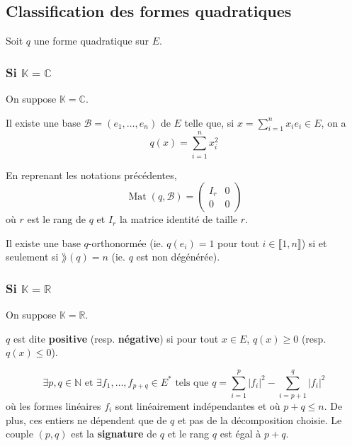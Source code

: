 	\subsection{Classification des formes quadratiques}
	
	Soit $q$ une forme quadratique sur $E$.
	
	\subsubsection{Si \texorpdfstring{$\mathbb{K} = \mathbb{C}$}{K = C}}
	
	On suppose $\mathbb{K} = \mathbb{C}$.
	
	
	\begin{theorem}
		Il existe une base $\mathcal{B} = (e_1, \dots, e_n)$ de $E$ telle que, si $x = \sum_{i=1}^n x_i e_i \in E$, on a
		\[ q(x) = \sum_{i=1}^n x_i^2 \]
	\end{theorem}
	
	\begin{remark}
		En reprenant les notations précédentes,
		\[
			\operatorname{Mat}(q, \mathcal{B}) =
			\begin{pmatrix}
				I_r & 0 \\
				0 & 0
			\end{pmatrix}
		\]
		où $r$ est le rang de $q$ et $I_r$ la matrice identité de taille $r$.
	\end{remark}
	
	\begin{corollary}
		Il existe une base $q$-orthonormée (ie. $q(e_i) = 1$ pour tout $i \in \llbracket 1, n \rrbracket$) si et seulement si $\rang(q) = n$ (ie. $q$ est non dégénérée).
	\end{corollary}
	
	\subsubsection{Si \texorpdfstring{$\mathbb{K} = \mathbb{R}$}{K = R}}
	
	On suppose $\mathbb{K} = \mathbb{R}$.
	
	
	\begin{definition}
		$q$ est dite \textbf{positive} (resp. \textbf{négative}) si pour tout $x \in E$, $q(x) \geq 0$ (resp. $q(x) \leq 0$).
	\end{definition}
	
	\begin{theorem}
		\[ \exists p, q \in \mathbb{N} \text{ et } \exists f_1, \dots, f_{p+q} \in E^* \text{ tels que } q = \sum_{i=1}^p |f_i|^2 - \sum_{i=p+1}^q |f_i|^2 \]
		où les formes linéaires $f_i$ sont linéairement indépendantes et où $p + q \leq n$. De plus, ces entiers ne dépendent que de $q$ et pas de la décomposition choisie.
		\newpar
		Le couple $(p,q)$ est la \textbf{signature} de $q$ et le rang $q$ est égal à $p+q$.
	\end{theorem}
	
